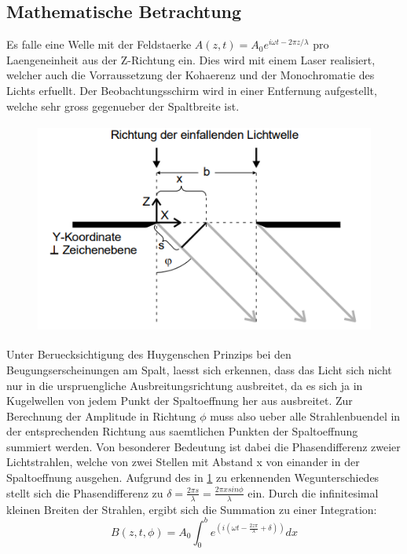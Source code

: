 \subsection{Mathematische Betrachtung}
Es falle eine Welle mit der Feldstaerke $A(z,t)=A_0e^{i\omega t-2\pi z/\lambda}$ pro Laengeneinheit aus der Z-Richtung ein. Dies wird mit einem Laser realisiert, welcher auch die Vorraussetzung der Kohaerenz und der Monochromatie des Lichts erfuellt. Der Beobachtungsschirm wird in einer Entfernung aufgestellt, welche sehr gross gegenueber der Spaltbreite ist. 
\begin{figure}[H]
    \centering
    \captionsetup{justification=centering}
    \includegraphics[height=7cm]{"Schema_BeugungSpalt.png"}
    \label{Fig:Schema}
\end{figure}
Unter Beruecksichtigung des Huygenschen Prinzips bei den Beugungserscheinungen am Spalt, laesst sich erkennen, dass das Licht sich nicht nur in die urspruengliche Ausbreitungsrichtung ausbreitet, da es sich ja in Kugelwellen von jedem Punkt der Spaltoeffnung her aus ausbreitet. Zur Berechnung der Amplitude in Richtung $\phi$ muss also ueber alle Strahlenbuendel in der entsprechenden Richtung aus saemtlichen Punkten der Spaltoeffnung summiert werden. Von besonderer Bedeutung ist dabei die Phasendifferenz zweier Lichtstrahlen, welche von zwei Stellen mit Abstand x von einander in der Spaltoeffnung ausgehen. Aufgrund des in \ref{Fig:Schema} zu erkennenden Wegunterschiedes stellt sich die Phasendifferenz zu $\delta=\frac{2\pi s}{\lambda}=\frac{2\pi x sin\phi}{\lambda}$ ein. Durch die infinitesimal kleinen Breiten der Strahlen, ergibt sich die Summation zu einer Integration:
\begin{equation*}
    B(z, t, \phi)=A_0\int_0^be^{(i(\omega t-\frac{2z\pi}{\lambda}+\delta))}dx
\end{equation*}
